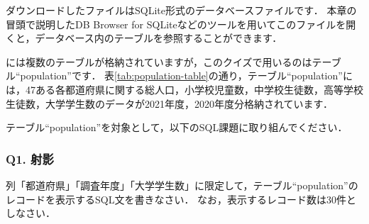 ダウンロードしたファイルはSQLite形式のデータベースファイルです．
本章の冒頭で説明したDB Browser for SQLiteなどのツールを用いてこのファイルを開くと，データベース内のテーブルを参照することができます．

には複数のテーブルが格納されていますが，このクイズで用いるのはテーブル``population''です．
表\ref{tab:population-table}の通り，テーブル``population''には，47ある各都道府県に関する総人口，小学校児童数，中学校生徒数，高等学校生徒数，大学学生数のデータが2021年度，2020年度分格納されています．
\begin{table}[!htbp]
    \centering
    \caption{SSDSE-Eからクイズ用に著者が抜粋・加工したデータ: テーブル``population''の内容}
    \label{tab:population-table}
\end{table}

テーブル``population''を対象として，以下のSQL課題に取り組んでください．

\subsubsection{Q1. 射影}
列「都道府県」「調査年度」「大学学生数」に限定して，テーブル``population''のレコードを表示するSQL文を書きなさい．
なお，表示するレコード数は30件としなさい．

